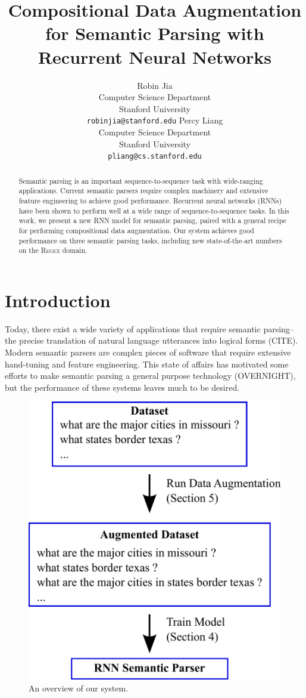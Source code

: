 \documentclass[11pt,letterpaper]{article}
\title{Compositional Data Augmentation for Semantic Parsing with Recurrent Neural Networks}
\author{Robin Jia\\
	    Computer Science Department\\
      Stanford University\\
	    {\tt robinjia@stanford.edu}
	  \And
    Percy Liang\\
    Computer Science Department\\
  	Stanford University\\
  {\tt pliang@cs.stanford.edu}}
\date{}
\newcommand{\regex}{\textsc{Regex}\xspace}
\begin{document}
\maketitle

\begin{abstract}
Semantic parsing is an important sequence-to-sequence task
with wide-ranging applications.
Current semantic parsers require complex machinery and
extensive feature engineering to achieve good performance.
Recurrent neural networks (RNNs)
have been shown to perform well at a wide range of sequence-to-sequence tasks.
In this work, we present a new RNN model for semantic parsing, paired with a general
recipe for performing compositional data augmentation.
Our system achieves good performance on three semantic parsing tasks,
including new state-of-the-art numbers on the \regex domain.
\end{abstract}

\section{Introduction}
Today, there exist a wide variety of applications that 
require semantic parsing--the precise translation of
natural language utterances into logical forms (CITE).
Modern semantic parsers are complex pieces of software
that require extensive hand-tuning and feature engineering.
This state of affairs has motivated some efforts
to make semantic parsing a general purpose technology (OVERNIGHT),
but the performance of these systems leaves much to be desired.

\begin{figure}[ht] 
\begin{center} 
  \includegraphics[scale=0.4]{fig-overview.pdf}
\end{center} 
\caption{An overview of our system.}
\label{fig:overview}
\end{figure}
\end{document}
